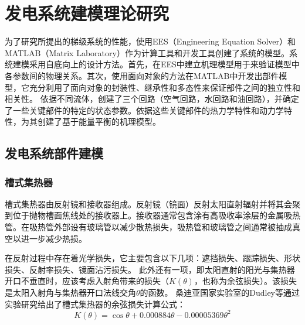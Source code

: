 \chapter{发电系统建模理论研究}
\label{cha:Modeling}

为了研究所提出的梯级系统的性能，使用EES（Engineering Equation Solver）和MATLAB（Matrix Laboratory）作为计算工具和开发工具创建了系统的模型。系统建模采用自底向上的设计方法。首先，在EES中建立机理模型用于来验证模型中各参数间的物理关系。其次，使用面向对象的方法在MATLAB中开发出部件模型，它充分利用了面向对象的封装性、继承性和多态性来保证部件之间的独立性和相关性。
依据不同流体，创建了三个回路（空气回路，水回路和油回路），并确定了一些关键部件的特定的状态参数。依据这些关键部件的热力学特性和动力学特性，为其创建了基于能量平衡的机理模型。

\section{发电系统部件建模}
\subsection{槽式集热器}
\label{sec:ptc}

槽式集热器由反射镜和接收器组成。反射镜（镜面）反射太阳直射辐射并将其会聚到位于抛物槽面焦线处的接收器上。接收器通常包含涂有高吸收率涂层的金属吸热管。在吸热管外部设有玻璃管以减少散热损失，吸热管和玻璃管之间通常被抽成真空以进一步减少热损。

在反射过程中存在着光学损失，它主要包含以下几项\cite{Price2002}：遮挡损失、跟踪损失、形状损失、反射率损失、镜面沾污损失。
此外还有一项，即太阳直射的阳光与集热器开口不垂直时，应该考虑入射角带来的损失（$K(\theta)$，也称为余弦损失）。该损失是太阳入射角与集热器开口法线交角$\theta$的函数。
桑迪亚国家实验室的Dudley等\cite{Dudley1994}通过实验研究给出了槽式集热器的余弦损失计算公式：
\begin{equation}
  K(\theta) = \cos\theta+0.000884\theta-0.00005369\theta^2
\end{equation}

